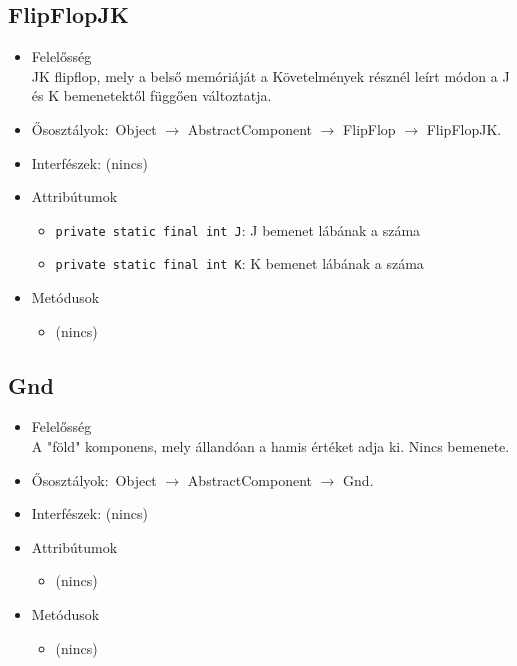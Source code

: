 \subsection{FlipFlopJK}
\begin{itemize}
\item Felelősség\\
JK flipflop, mely a belső memóriáját a Követelmények résznél leírt módon  a J és K bemenetektől függően változtatja.
\item Ősosztályok:\ Object $\rightarrow{}$ AbstractComponent $\rightarrow{}$ FlipFlop $\rightarrow{}$ FlipFlopJK.
\item Interfészek: (nincs)
\item Attribútumok $\ $
\begin{itemize}
	\item \texttt{private static final int J}: J bemenet lábának a száma
	\item \texttt{private static final int K}: K bemenet lábának a száma
\end{itemize}
\item Metódusok$\ $
\begin{itemize}
\item (nincs)
\end{itemize}
\end{itemize}

\subsection{Gnd}
\begin{itemize}
\item Felelősség\\
A "föld" komponens, mely állandóan a hamis értéket adja ki. Nincs bemenete.
\item Ősosztályok:\ Object $\rightarrow{}$ AbstractComponent $\rightarrow{}$ Gnd.
\item Interfészek: (nincs)
\item Attribútumok $\ $
\begin{itemize}
\item (nincs)
\end{itemize}
\item Metódusok$\ $
\begin{itemize}
\item (nincs)
\end{itemize}
\end{itemize}

